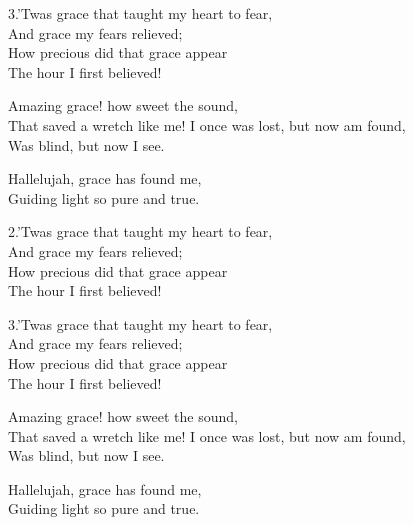 \documentclass[12pt]{article}
\begin{document}
\begin{stanza}
3.’Twas grace that taught my heart to fear,\\
And grace my fears relieved;\\
How precious did that grace appear\\
The hour I first believed!
\end{stanza}



\begin{stanza}
Amazing grace! how sweet the sound,\\
That saved a wretch like me!
I once was lost, but now am found,\\
Was blind, but now I see.
\end{stanza}

\begin{chorus}
Hallelujah, grace has found me,\\
Guiding light so pure and true.
\end{chorus}

\begin{stanza}
2.’Twas grace that taught my heart to fear,\\
And grace my fears relieved;\\
How precious did that grace appear\\
The hour I first believed!
\end{stanza}

\begin{stanza}
3.’Twas grace that taught my heart to fear,\\
And grace my fears relieved;\\
How precious did that grace appear\\
The hour I first believed!
\end{stanza}



\begin{stanza}
Amazing grace! how sweet the sound,\\
That saved a wretch like me!
I once was lost, but now am found,\\
Was blind, but now I see.
\end{stanza}

\begin{chorus}
Hallelujah, grace has found me,\\
Guiding light so pure and true.
\end{chorus}
\end{document}
